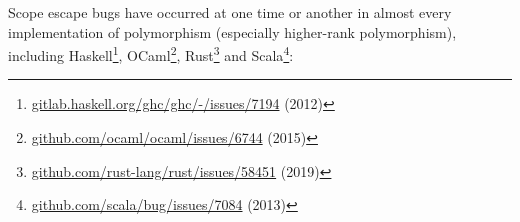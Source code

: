 \documentclass[11pt,oneside]{article}
\begin{document}
Scope escape bugs have occurred at one time or another in almost every implementation of polymorphism (especially higher-rank polymorphism), including Haskell\footnote{\href{https://gitlab.haskell.org/ghc/ghc/-/issues/7194}{gitlab.haskell.org/\allowbreak{}ghc/\allowbreak{}ghc/\allowbreak{}-/\allowbreak{}issues/\allowbreak{}7194} (2012)}, OCaml\footnote{\href{https://github.com/ocaml/ocaml/issues/6744}{github.com/\allowbreak{}ocaml/\allowbreak{}ocaml/\allowbreak{}issues/\allowbreak{}6744} (2015)}, Rust\footnote{\href{https://github.com/rust-lang/rust/issues/58451}{github.com/\allowbreak{}rust-lang/\allowbreak{}rust/\allowbreak{}issues/\allowbreak{}58451} (2019)} and Scala\footnote{\href{https://github.com/scala/bug/issues/7084}{github.com/\allowbreak{}scala/\allowbreak{}bug/\allowbreak{}issues/\allowbreak{}7084} (2013)}:
\end{document}
